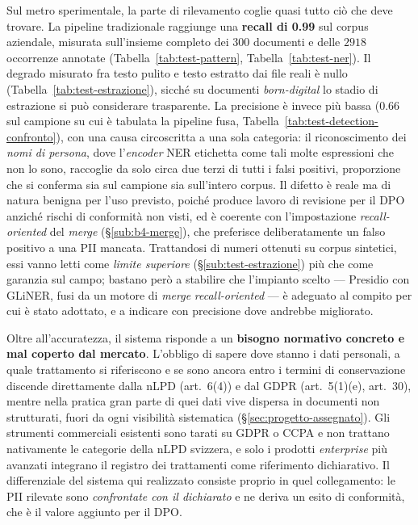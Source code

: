 Sul metro sperimentale, la parte di rilevamento coglie quasi tutto ciò che deve trovare. La pipeline tradizionale raggiunge una \textbf{recall di 0.99} sul corpus aziendale, misurata sull'insieme completo dei $300$ documenti e delle $2918$ occorrenze annotate (Tabella~\ref{tab:test-pattern}, Tabella~\ref{tab:test-ner}). Il degrado misurato fra testo pulito e testo estratto dai file reali è nullo (Tabella~\ref{tab:test-estrazione}), sicché su documenti \emph{born-digital} lo stadio di estrazione si può considerare trasparente. La precisione è invece più bassa ($0.66$ sul campione su cui è tabulata la pipeline fusa, Tabella~\ref{tab:test-detection-confronto}), con una causa circoscritta a una sola categoria: il riconoscimento dei \emph{nomi di persona}, dove l'\textit{encoder} NER etichetta come tali molte espressioni che non lo sono, raccoglie da solo circa due terzi di tutti i falsi positivi, proporzione che si conferma sia sul campione sia sull'intero corpus. Il difetto è reale ma di natura benigna per l'uso previsto, poiché produce lavoro di revisione per il DPO anziché rischi di conformità non visti, ed è coerente con l'impostazione \textit{recall-oriented} del \emph{merge} (§\ref{sub:b4-merge}), che preferisce deliberatamente un falso positivo a una PII mancata. Trattandosi di numeri ottenuti su corpus sintetici, essi vanno letti come \emph{limite superiore} (§\ref{sub:test-estrazione}) più che come garanzia sul campo; bastano però a stabilire che l'impianto scelto --- Presidio con GLiNER, fusi da un motore di \textit{merge} \textit{recall-oriented} --- è adeguato al compito per cui è stato adottato, e a indicare con precisione dove andrebbe migliorato.

Oltre all'accuratezza, il sistema risponde a un \textbf{bisogno normativo concreto e mal coperto dal mercato}. L'obbligo di sapere dove stanno i dati personali, a quale trattamento si riferiscono e se sono ancora entro i termini di conservazione discende direttamente dalla nLPD (art.~6(4)) e dal GDPR (art.~5(1)(e), art.~30), mentre nella pratica gran parte di quei dati vive dispersa in documenti non strutturati, fuori da ogni visibilità sistematica (§\ref{sec:progetto-assegnato}). Gli strumenti commerciali esistenti sono tarati su GDPR o CCPA e non trattano nativamente le categorie della nLPD svizzera, e solo i prodotti \textit{enterprise} più avanzati integrano il registro dei trattamenti come riferimento dichiarativo. Il differenziale del sistema qui realizzato consiste proprio in quel collegamento: le PII rilevate sono \emph{confrontate con il dichiarato} e ne deriva un esito di conformità, che è il valore aggiunto per il DPO.

